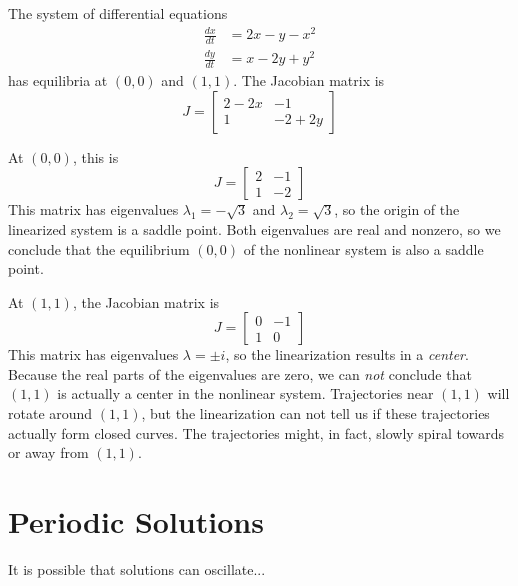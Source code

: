 \begin{xexample}
The system of differential equations
\begin{equation}
\begin{split}
  \frac{dx}{dt} & = 2x - y -x^2 \\
  \frac{dy}{dt} & = x - 2y + y^2
\end{split}
\end{equation}
has equilibria at $(0,0)$ and $(1,1)$.
The Jacobian matrix is
\begin{equation}
  J = \begin{bmatrix}
           2-2x & -1 \\
	   1 & -2 + 2y
      \end{bmatrix}
\end{equation}

At $(0,0)$, this is
\begin{equation}
  J = \begin{bmatrix}
           2 & -1 \\
	   1 & -2
      \end{bmatrix}
\end{equation}
This matrix has eigenvalues $\lambda_1 = -\sqrt{3}$ 
and $\lambda_2 = \sqrt{3}$, so the
origin of the  linearized system is a saddle point.
Both eigenvalues are real and nonzero,
so we conclude that the equilibrium
$(0,0)$ of the nonlinear system is also a saddle point.

At $(1,1)$, the Jacobian matrix is
\begin{equation}
  J = \begin{bmatrix}
           0 & -1 \\
	   1 & 0
      \end{bmatrix}
\end{equation}
This matrix has eigenvalues $\lambda=\pm i$,
so the linearization results in a \emph{center}.
Because the real parts of the eigenvalues are
zero, we can \emph{not} conclude that $(1,1)$
is actually a center in the nonlinear system.
Trajectories near $(1,1)$ will rotate around $(1,1)$, but
the linearization can not tell us if these trajectories
actually form closed curves.
The trajectories might, in fact, slowly spiral
towards or away from $(1,1)$.
\end{xexample}
%
\newpage
%
%
\section{Periodic Solutions}
It is possible that solutions can oscillate...
% 

